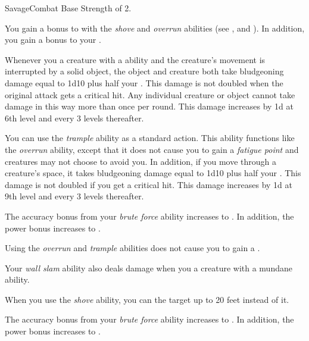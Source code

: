     \begin{feat}{Savage}{Combat}
        \featpre Base Strength of 2.

         You gain a  bonus to  with the \textit{shove} and \textit{overrun} abilities (see , and ).
        In addition, you gain a  bonus to your  .

         Whenever you  a creature with a  ability and the creature's movement is interrupted by a solid object, the object and creature both take bludgeoning damage equal to 1d10 plus half your .
        This damage is not doubled when the original attack gets a critical hit.
        Any individual creature or object cannot take damage in this way more than once per round.
        This damage increases by \plus1d at 6th level and every 3 levels thereafter.

         You can use the \textit{trample} ability as a standard action.
        This ability functions like the \textit{overrun} ability, except that it does not cause you to gain a \textit{fatigue point} and creatures may not choose to avoid you.
        In addition, if you move through a creature's space, it takes bludgeoning damage equal to 1d10 plus half your .
        This damage is not doubled if you get a critical hit.
        This damage increases by \plus1d at 9th level and every 3 levels thereafter.

         The accuracy bonus from your \textit{brute force} ability increases to .
        In addition, the power bonus increases to .

         Using the \textit{overrun} and \textit{trample} abilities does not cause you to gain a .

         Your \textit{wall slam} ability also deals damage when you  a creature with a mundane ability.

         When you use the \textit{shove} ability, you can  the target up to 20 feet instead of  it.

         The accuracy bonus from your \textit{brute force} ability increases to .
        In addition, the power bonus increases to .
    \end{feat}

